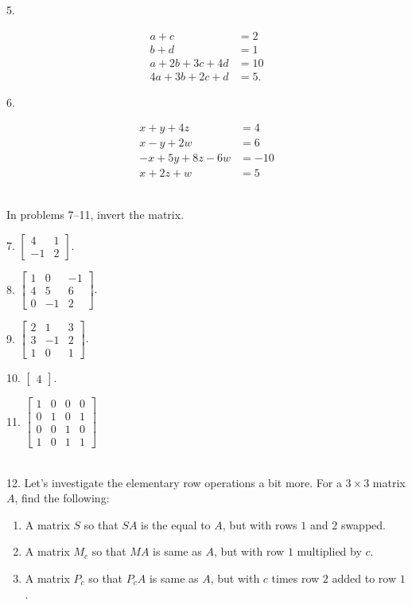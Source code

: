 \documentclass{article}
\begin{document}
5.

\begin{align*}
	a + c &= 2\\
	b + d &= 1\\
	a + 2b + 3c + 4d &= 10\\
	4a + 3b + 2c + d &= 5.
\end{align*}

6.

\begin{align*}
	x + y + 4z &= 4\\
	x - y + 2w &= 6\\
	-x + 5y + 8z - 6w &= -10\\
	x + 2z + w &= 5
\end{align*}

~\\

In problems 7--11, invert the matrix.

7. $\displaystyle \left[\begin{array}{cc}4& 1 \\ -1& 2\end{array}\right].$

8. $\displaystyle \left[\begin{array}{ccc}1& 0& -1 \\ 4& 5& 6 \\ 0& -1& 2\end{array}\right].$

9. $\displaystyle \left[\begin{array}{ccc}2& 1& 3 \\ 3& -1& 2 \\ 1& 0& 1\end{array}\right].$

10. $\displaystyle \left[\begin{array}{c}4\end{array}\right].$

11. $\displaystyle \left[\begin{array}{cccc}1& 0& 0& 0 \\ 0& 1& 0& 1 \\ 0& 0& 1& 0 \\ 1& 0& 1& 1\end{array}\right]$

~\\

12. Let's investigate the elementary row operations a bit more. For a $3 \times 3$ matrix $A$, find the following:

\begin{enumerate}

	\item A matrix $S$ so that $SA$ is the equal to $A$, but with rows $1$ and $2$ swapped.

	\item A matrix $M_c$ so that $MA$ is same as $A$, but with row $1$ multiplied by $c$.

	\item A matrix $P_c$ so that $P_cA$ is same as $A$, but with $c$ times row $2$ added to row $1$.

\end{enumerate}
\end{document}
